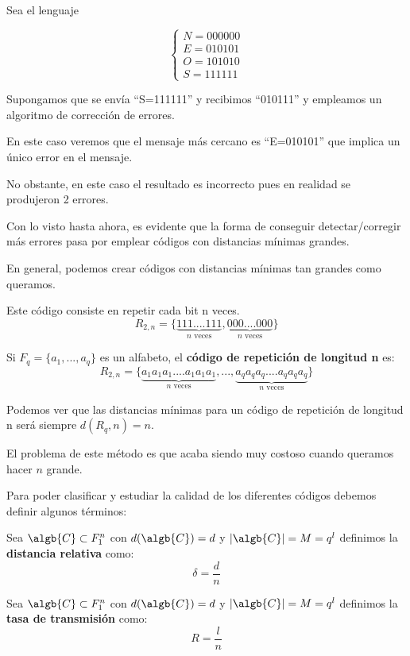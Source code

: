 \begin{example}
Sea el lenguaje

\[\left\{ \begin{array}{l}
N = 000000 \\ E = 010101 \\ O = 101010 \\ S = 111111
\end{array}\right.\]

Supongamos que se envía ``S=111111'' y recibimos ``010111'' y empleamos un algoritmo de corrección de errores.

En este caso veremos que el mensaje más cercano es ``E=010101'' que implica un único error en el mensaje.

No obstante, en este caso el resultado es incorrecto pues en realidad se produjeron 2 errores.
\end{example}

Con lo visto hasta ahora, es evidente que la forma de conseguir detectar/corregir más errores pasa por emplear códigos con distancias mínimas grandes.

En general, podemos crear códigos con distancias mínimas tan grandes como queramos.

\begin{defn}
Este código consiste en repetir cada bit n veces.
\[R_{2,n}=\{\underbrace{111....111}_{n\text{ veces}}, \underbrace{000....000}_{n\text{ veces}}\}\]

Si $F_q=\{a_1,...,a_q\}$ es un alfabeto, el \textbf{código de repetición de longitud n} es:
\[R_{2,n}=\{\underbrace{a_1a_1a_1....a_1a_1a_1}_{n\text{ veces}}, ... , \underbrace{a_qa_qa_q....a_qa_qa_q}_{n\text{ veces}}\}\]
\end{defn}

Podemos ver que las distancias mínimas para un código de repetición de longitud n será siempre $d(R_q,n)=n$.

El problema de este método es que acaba siendo muy costoso cuando queramos hacer $n$ grande.

Para poder clasificar y estudiar la calidad de los diferentes códigos debemos definir algunos términos:

\begin{defn}
Sea $\algb{C} \subset F_1^n$ con $d(\algb{C})=d$ y $|\algb{C}|=M=q^l$ definimos la \textbf{distancia relativa} como:
\[δ=\frac{d}{n}\]
\end{defn}

\begin{defn}
Sea $\algb{C} \subset F_1^n$ con $d(\algb{C})=d$ y $|\algb{C}|=M=q^l$ definimos la \textbf{tasa de transmisión} como:
\[R=\frac{l}{n}\]
\end{defn}

